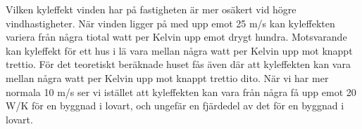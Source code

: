 Vilken kyleffekt vinden har på fastigheten är mer osäkert vid högre vindhastigheter. När vinden
 ligger på med upp emot 25 m/s kan kyleffekten variera från några tiotal watt per Kelvin upp 
 emot drygt hundra. Motsvarande kan kyleffekt för ett hus i lä vara mellan några watt per 
 Kelvin upp mot knappt trettio. För det teoretiskt beräknade huset fås även där att kyleffekten 
 kan vara mellan några watt per Kelvin upp mot knappt trettio dito. När vi har mer normala 10 
 m/s ser vi istället att kyleffekten kan vara från några få upp emot 20 W/K för en byggnad i 
 lovart, och ungefär en fjärdedel av det för en byggnad i lovart.
